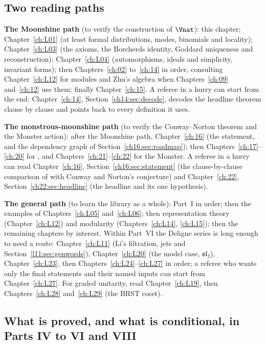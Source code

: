 \subsection{Two reading paths}\label{ch01:sec:paths}

\textbf{The Moonshine path} (to verify the construction of $\Vnat$): this chapter;
Chapter~\ref{ch:L01} (at least formal distributions, modes, binomials and locality);
Chapter~\ref{ch:L03} (the axioms, the Borcherds identity, Goddard uniqueness and reconstruction);
Chapter~\ref{ch:L04} (automorphisms, ideals and simplicity, invariant forms); then
Chapters~\ref{ch:02} to~\ref{ch:14} in order, consulting Chapter~\ref{ch:L12} for modules and Zhu's
algebra when Chapters~\ref{ch:09} and~\ref{ch:12} use them; finally Chapter~\ref{ch:15}. A referee in
a hurry can start from the end: Chapter~\ref{ch:14}, Section~\ref{ch14:sec:decode}, decodes the
headline theorem clause by clause and points back to every definition it uses.

\textbf{The monstrous-moonshine path} (to verify the Conway--Norton theorem and the Monster action): after the
Moonshine path, Chapter~\ref{ch:16} (the statement, and the dependency graph of Section~\ref{ch16:sec:roadmap}); then
Chapters~\ref{ch:17}--\ref{ch:20} for , and Chapters~\ref{ch:21}--\ref{ch:22} for the Monster. A
referee in a hurry can read Chapter~\ref{ch:16}, Section~\ref{ch16:sec:statement} (the clause-by-clause comparison of
 with Conway and Norton's conjecture) and Chapter~\ref{ch:22},
Section~\ref{ch22:sec:headline} (the headline and its one hypothesis).

\textbf{The general path} (to learn the library as a whole): Part~I in order; then the examples of
Chapters~\ref{ch:L05} and~\ref{ch:L06}; then representation theory (Chapter~\ref{ch:L12}) and
modularity (Chapters~\ref{ch:L14}, \ref{ch:L15}); then the remaining chapters by interest.
Within Part~VI the Deligne series is long enough to need a route: Chapter~\ref{ch:L11}
(Li's filtration, jets and Section~\ref{l11:sec:genwords}), Chapter~\ref{ch:L20} (the model case,
$\mathfrak{sl}_2$), Chapter~\ref{ch:L23}, then Chapters~\ref{ch:L24}--\ref{ch:L27} in order; a referee who
wants only the final statements and their named inputs can start from Chapter~\ref{ch:L27}. For graded
unitarity, read Chapter~\ref{ch:L19}, then Chapters~\ref{ch:L28} and~\ref{ch:L29} (the BRST coset).

\subsection{What is proved, and what is conditional, in Parts IV to VI and VIII}\label{ch01:sec:newstatus}


